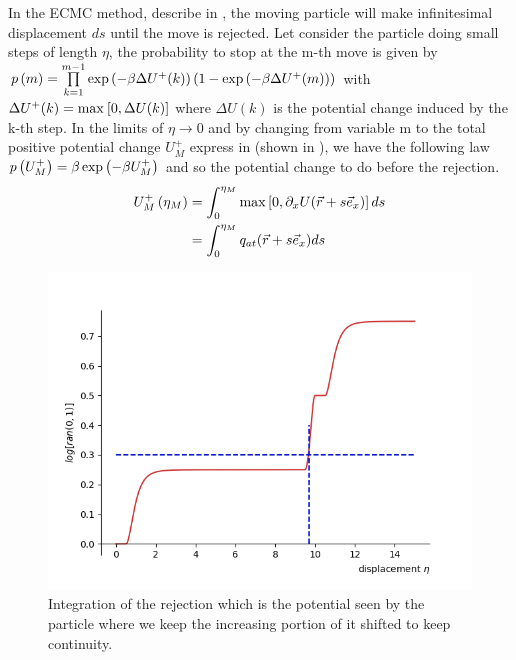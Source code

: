 \documentclass[jcp,twocolumn,longbibliography,superscriptaddress]{revtex4-2}
\begin{document}
	In the ECMC method, describe in \cite{Faulkner2018}, the moving particle will make infinitesimal displacement $ds$ until the move is rejected.
	Let consider the particle doing small steps of length $\eta$, the probability to stop at the m-th move is given by $p\left( m\right) = \prod \limits_{k = 1}^{m-1} \exp \left( -\beta\Delta U^+(k) \right) (1 - \exp \left( -\beta\Delta U^+(m) \right))$ with $\Delta U^+(k) = \max^{} \left[ 0, \Delta U(k) \right]$ where $\Delta U(k)$ is the potential change induced by the k-th step.	
	In the limits of $\eta \rightarrow 0$ and by changing from variable m to the total positive potential change $U^+_M$ express in  (shown in ), we have the following law $p\left( U^+_M \right) = \beta\exp \left( -\beta U^+_M \right)$ and so the potential change to do before the rejection.
	\begin{equation}
		\label{eq: LJcummulative}
		\begin{split}
			U^+_M \left( \eta_M \right) &= \int_{0}^{\eta_M} \max^{} \left[ 0, \partial_x U (\vec{r} + s \vec{e}_x) \right] ds\\
			&= \int_{0}^{\eta_M} q_{at}(\vec{r} + s \vec{e}_x) ds
		\end{split}
	\end{equation}
	\begin{figure}[htb]
		\centering
		\includegraphics[width=\columnwidth]{./Figures/LJ_cumulative.png}
		\caption{Integration of the rejection which is the potential seen by the particle where we keep the increasing portion of it shifted to keep continuity.}
		\label{LJCumulative}
	\end{figure}
	
\end{document}
